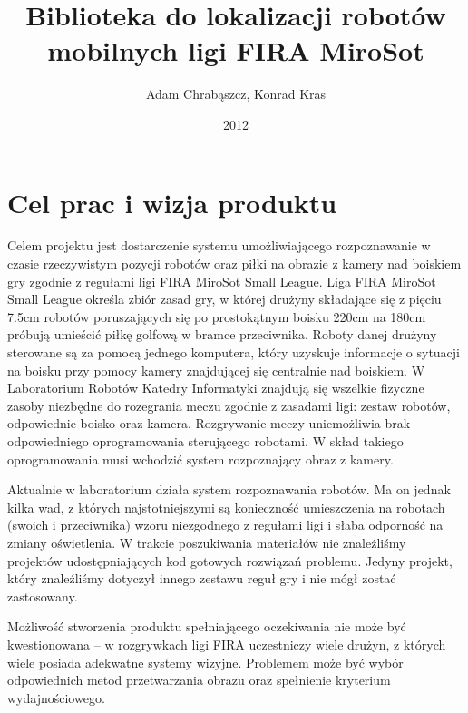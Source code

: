 \documentclass[polish,12pt]{aghthesis}
\author{Adam Chrabąszcz, Konrad Kras}
\title{Biblioteka do lokalizacji robotów mobilnych ligi FIRA MiroSot}
\date{2012}
\begin{document}
\maketitle



\section{Cel prac i wizja produktu}
\label{sec:cel-wizja}
Celem projektu jest
dostarczenie systemu umożliwiającego rozpoznawanie w czasie rzeczywistym
pozycji robotów oraz piłki na obrazie z kamery nad boiskiem gry zgodnie z
regułami ligi FIRA MiroSot Small League.
Liga FIRA MiroSot Small League określa zbiór zasad gry, w której drużyny
składające się z pięciu 7.5cm robotów poruszających się po prostokątnym boisku
220cm na 180cm próbują umieścić piłkę golfową w bramce przeciwnika. Roboty danej
drużyny sterowane są za pomocą jednego komputera, który uzyskuje informacje
o sytuacji na boisku przy pomocy kamery znajdującej się centralnie nad boiskiem.
W Laboratorium Robotów Katedry Informatyki znajdują się wszelkie fizyczne zasoby
niezbędne do rozegrania meczu zgodnie z zasadami ligi: zestaw robotów, 
odpowiednie boisko oraz kamera. Rozgrywanie meczy uniemożliwia brak 
odpowiedniego oprogramowania sterującego robotami. W skład takiego 
oprogramowania musi wchodzić system rozpoznający obraz z kamery. 

Aktualnie w laboratorium działa system rozpoznawania robotów. Ma on jednak kilka
wad, z których najstotniejszymi są konieczność umieszczenia na robotach
(swoich i przeciwnika) wzoru niezgodnego z regułami ligi
i słaba odporność na zmiany oświetlenia.
W trakcie poszukiwania materiałów nie znaleźliśmy projektów udostępniających
kod gotowych rozwiązań problemu. Jedyny projekt, który znaleźliśmy dotyczył
innego zestawu reguł gry i nie mógł zostać zastosowany. 

Możliwość stworzenia produktu spełniającego oczekiwania nie może być 
kwestionowana -- w rozgrywkach ligi FIRA uczestniczy wiele drużyn, z których wiele
posiada adekwatne systemy wizyjne. Problemem może być wybór odpowiednich metod 
przetwarzania obrazu oraz spełnienie kryterium wydajnościowego. 
\end{document}
